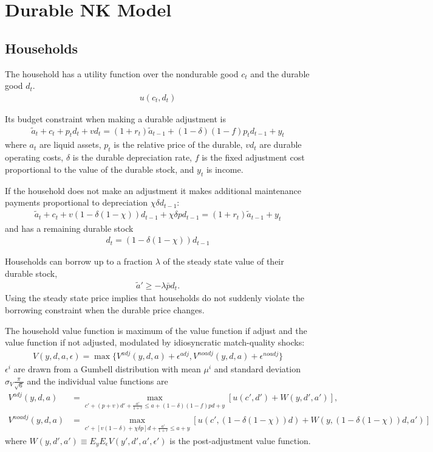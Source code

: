 \documentclass[11pt]{article}
\begin{document}
\section{Durable NK Model}

\subsection{Households}

The household has a utility function over the nondurable good $c_t$ and the durable good $d_t$.
\begin{align*}
	u(c_t,d_t)
\end{align*}

Its budget constraint when making a durable adjustment is
\begin{align*}
    \tilde{a}_{t}+c_t+ p_t d_t + v d_t = (1+r_t)\tilde{a}_{t-1} + (1-\delta)(1-f)p_td_{t-1} + y_t
\end{align*}
where $a_t$ are liquid assets, $p_t$ is the relative price of the durable, $vd_t$
are durable operating costs, $\delta$ is the durable depreciation rate, $f$ 
is the fixed adjustment cost proportional to the value of the durable stock, and $y_t$
is income.

If the household does not make an adjustment it makes additional maintenance 
payments proportional to depreciation $\chi\delta d_{t-1}$:
\begin{align*}
    \tilde{a}_t+c_t + v(1-\delta(1-\chi))d_{t-1} + \chi \delta pd_{t-1} = (1+r_t)\tilde{a}_{t-1} + y_t
\end{align*}
and has a remaining durable stock
\begin{align*}
	d_t = (1-\delta(1-\chi))d_{t-1}
\end{align*}

Households can borrow up to a fraction $\lambda$ of the steady state value of their
durable stock,
\begin{align*}
    \tilde{a}'\ge - \lambda \bar{p} d_t.
\end{align*}
Using the steady state price implies that households do not suddenly violate
the borrowing constraint when the durable price changes.

The household value function is maximum of the value function if adjust and the value function if not adjusted, 
modulated by idiosyncratic match-quality shocks:
\begin{align*}
    V(y,d,a,\epsilon) = \max\{V^{adj}(y,d,a) + \epsilon^{adj}, V^{noadj}(y,d,a) + \epsilon^{noadj} \}
\end{align*}
$\epsilon^i$ are drawn from a Gumbell distribution with mean $\mu^i$ and standard deviation 
$\sigma_V\frac{\pi}{\sqrt{6}}$ and the individual value functions are
\begin{align*}
    V^{adj}(y,d,a)&=\max_{c'+(p+v)d'+\frac{a'}{1+r}\le a+(1-\delta)(1-f)pd+y}[u(c',d') + W(y,d',a')], \\
    V^{noadj}(y,d,a)&=\max_{c'+[v(1-\delta)+\chi \delta p]d+\frac{a'}{1+r}\le a+y}[u(c',(1-\delta(1-\chi))d) + W(y,(1-\delta(1-\chi))d,a')]
\end{align*}
where $ W(y,d',a') \equiv E_y E_\epsilon V(y',d',a',\epsilon')$ is the post-adjustment value function.
\end{document}
